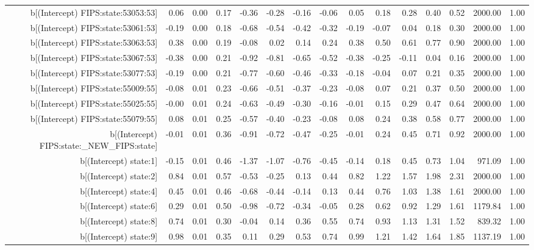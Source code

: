 \begin{table}[ht]
\begin{tabular}{rrrrrrrrrrrrrrr}
  b[(Intercept) FIPS:state:53053:53] & 0.06 & 0.00 & 0.17 & -0.36 & -0.28 & -0.16 & -0.06 & 0.05 & 0.18 & 0.28 & 0.40 & 0.52 & 2000.00 & 1.00 \\ 
  b[(Intercept) FIPS:state:53061:53] & -0.19 & 0.00 & 0.18 & -0.68 & -0.54 & -0.42 & -0.32 & -0.19 & -0.07 & 0.04 & 0.18 & 0.30 & 2000.00 & 1.00 \\ 
  b[(Intercept) FIPS:state:53063:53] & 0.38 & 0.00 & 0.19 & -0.08 & 0.02 & 0.14 & 0.24 & 0.38 & 0.50 & 0.61 & 0.77 & 0.90 & 2000.00 & 1.00 \\ 
  b[(Intercept) FIPS:state:53067:53] & -0.38 & 0.00 & 0.21 & -0.92 & -0.81 & -0.65 & -0.52 & -0.38 & -0.25 & -0.11 & 0.04 & 0.16 & 2000.00 & 1.00 \\ 
  b[(Intercept) FIPS:state:53077:53] & -0.19 & 0.00 & 0.21 & -0.77 & -0.60 & -0.46 & -0.33 & -0.18 & -0.04 & 0.07 & 0.21 & 0.35 & 2000.00 & 1.00 \\ 
  b[(Intercept) FIPS:state:55009:55] & -0.08 & 0.01 & 0.23 & -0.66 & -0.51 & -0.37 & -0.23 & -0.08 & 0.07 & 0.21 & 0.37 & 0.50 & 2000.00 & 1.00 \\ 
  b[(Intercept) FIPS:state:55025:55] & -0.00 & 0.01 & 0.24 & -0.63 & -0.49 & -0.30 & -0.16 & -0.01 & 0.15 & 0.29 & 0.47 & 0.64 & 2000.00 & 1.00 \\ 
  b[(Intercept) FIPS:state:55079:55] & 0.08 & 0.01 & 0.25 & -0.57 & -0.40 & -0.23 & -0.08 & 0.08 & 0.24 & 0.38 & 0.58 & 0.77 & 2000.00 & 1.00 \\ 
  b[(Intercept) FIPS:state:\_NEW\_FIPS:state] & -0.01 & 0.01 & 0.36 & -0.91 & -0.72 & -0.47 & -0.25 & -0.01 & 0.24 & 0.45 & 0.71 & 0.92 & 2000.00 & 1.00 \\ 
  b[(Intercept) state:1] & -0.15 & 0.01 & 0.46 & -1.37 & -1.07 & -0.76 & -0.45 & -0.14 & 0.18 & 0.45 & 0.73 & 1.04 & 971.09 & 1.00 \\ 
  b[(Intercept) state:2] & 0.84 & 0.01 & 0.57 & -0.53 & -0.25 & 0.13 & 0.44 & 0.82 & 1.22 & 1.57 & 1.98 & 2.31 & 2000.00 & 1.00 \\ 
  b[(Intercept) state:4] & 0.45 & 0.01 & 0.46 & -0.68 & -0.44 & -0.14 & 0.13 & 0.44 & 0.76 & 1.03 & 1.38 & 1.61 & 2000.00 & 1.00 \\ 
  b[(Intercept) state:6] & 0.29 & 0.01 & 0.50 & -0.98 & -0.72 & -0.34 & -0.05 & 0.28 & 0.62 & 0.92 & 1.29 & 1.61 & 1179.84 & 1.00 \\ 
  b[(Intercept) state:8] & 0.74 & 0.01 & 0.30 & -0.04 & 0.14 & 0.36 & 0.55 & 0.74 & 0.93 & 1.13 & 1.31 & 1.52 & 839.32 & 1.00 \\ 
  b[(Intercept) state:9] & 0.98 & 0.01 & 0.35 & 0.11 & 0.29 & 0.53 & 0.74 & 0.99 & 1.21 & 1.42 & 1.64 & 1.85 & 1137.19 & 1.00 \\ 

\end{tabular}
\end{table}
